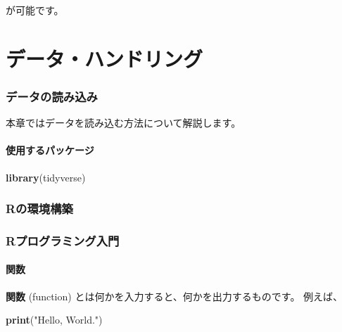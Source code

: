 \documentclass[]{bxjsarticle}
\newenvironment{Shaded}{\begin{snugshade}}{\end{snugshade}}
\newcommand{\KeywordTok}[1]{\textcolor[rgb]{0.13,0.29,0.53}{\textbf{#1}}}
\newcommand{\NormalTok}[1]{#1}
\newcommand{\StringTok}[1]{\textcolor[rgb]{0.31,0.60,0.02}{#1}}
\begin{document}
が可能です。

\hypertarget{part-ux30c7ux30fcux30bfux30cfux30f3ux30c9ux30eaux30f3ux30b0}{%
\part{データ・ハンドリング}\label{part-ux30c7ux30fcux30bfux30cfux30f3ux30c9ux30eaux30f3ux30b0}}

\hypertarget{data-import}{%
\section{データの読み込み}\label{data-import}}

本章ではデータを読み込む方法について解説します。

\hypertarget{ux4f7fux7528ux3059ux308bux30d1ux30c3ux30b1ux30fcux30b8}{%
\subsection{使用するパッケージ}\label{ux4f7fux7528ux3059ux308bux30d1ux30c3ux30b1ux30fcux30b8}}

\begin{Shaded}
\begin{Highlighting}[]
\KeywordTok{library}\NormalTok{(tidyverse)}
\end{Highlighting}
\end{Shaded}

\hypertarget{appendix-ux88dcux8ad6}{%
\appendix}


\hypertarget{install-r}{%
\section{Rの環境構築}\label{install-r}}

\hypertarget{intro-r}{%
\section{Rプログラミング入門}\label{intro-r}}

\hypertarget{ux95a2ux6570}{%
\subsection{関数}\label{ux95a2ux6570}}

\textbf{関数} (function) とは何かを入力すると、何かを出力するものです。
例えば、

\begin{Shaded}
\begin{Highlighting}[]
\KeywordTok{print}\NormalTok{(}\StringTok{"Hello, World."}\NormalTok{)}
\end{Highlighting}
\end{Shaded}
\end{document}
